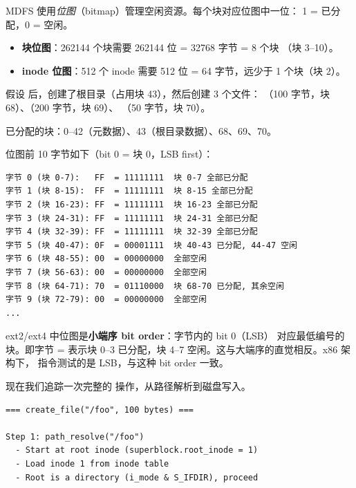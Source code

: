 \begin{filesystemlayout}

MDFS 使用\emph{位图}（bitmap）管理空闲资源。每个块对应位图中一位：
1 = 已分配，0 = 空闲。

\begin{itemize}\tightlist
\item \textbf{块位图}：262144 个块需要 262144 位 = 32768 字节 = 8 个块
  （块 3--10）。
\item \textbf{inode 位图}：512 个 inode 需要 512 位 = 64 字节，远少于
  1 个块（块 2）。
\end{itemize}


假设  后，创建了根目录（占用块 43），然后创建 3 个文件：
（100 字节，块 68）、（200 字节，块 69）、
（50 字节，块 70）。

已分配的块：0--42（元数据）、43（根目录数据）、68、69、70。

位图前 10 字节如下（bit 0 = 块 0，LSB first）：

\begin{lstlisting}
字节 0 (块 0-7):   FF  = 11111111  块 0-7 全部已分配
字节 1 (块 8-15):  FF  = 11111111  块 8-15 全部已分配
字节 2 (块 16-23): FF  = 11111111  块 16-23 全部已分配
字节 3 (块 24-31): FF  = 11111111  块 24-31 全部已分配
字节 4 (块 32-39): FF  = 11111111  块 32-39 全部已分配
字节 5 (块 40-47): 0F  = 00001111  块 40-43 已分配, 44-47 空闲
字节 6 (块 48-55): 00  = 00000000  全部空闲
字节 7 (块 56-63): 00  = 00000000  全部空闲
字节 8 (块 64-71): 70  = 01110000  块 68-70 已分配, 其余空闲
字节 9 (块 72-79): 00  = 00000000  全部空闲
...
\end{lstlisting}

\begin{warningbox}
ext2/ext4 中位图是\textbf{小端序 bit order}：字节内的 bit 0（LSB）
对应最低编号的块。即字节  =  表示块
0--3 已分配，块 4--7 空闲。这与大端序的直觉相反。x86 架构下，
 指令测试的是 LSB，与这种 bit order 一致。
\end{warningbox}


现在我们追踪一次完整的  操作，从路径解析到磁盘写入。

\begin{lstlisting}
=== create_file("/foo", 100 bytes) ===

Step 1: path_resolve("/foo")
  - Start at root inode (superblock.root_inode = 1)
  - Load inode 1 from inode table
  - Root is a directory (i_mode & S_IFDIR), proceed


\end{lstlisting}
\end{filesystemlayout}
